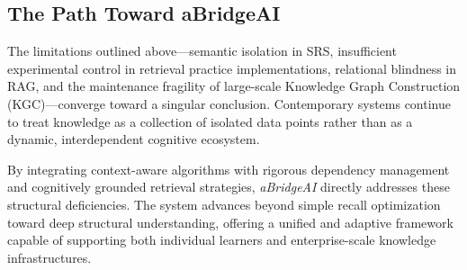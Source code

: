 \subsection{The Path Toward aBridgeAI}

The limitations outlined above—semantic isolation in SRS, insufficient experimental control in retrieval practice implementations, relational blindness in RAG, and the maintenance fragility of large-scale Knowledge Graph Construction (KGC)—converge toward a singular conclusion. Contemporary systems continue to treat knowledge as a collection of isolated data points rather than as a dynamic, interdependent cognitive ecosystem.

By integrating context-aware algorithms with rigorous dependency management and cognitively grounded retrieval strategies, \textit{aBridgeAI} directly addresses these structural deficiencies. The system advances beyond simple recall optimization toward deep structural understanding, offering a unified and adaptive framework capable of supporting both individual learners and enterprise-scale knowledge infrastructures.